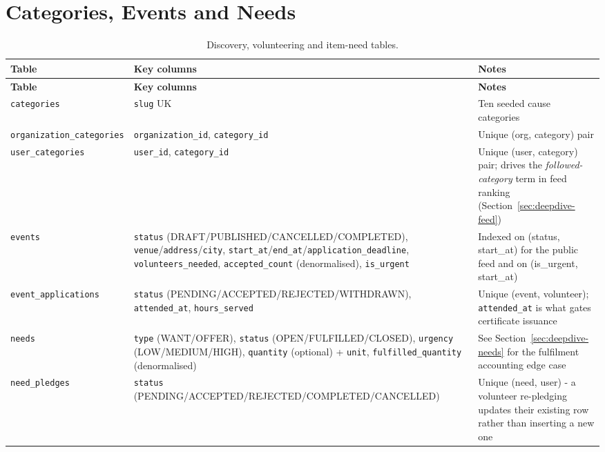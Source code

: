 \section{Categories, Events and Needs}
\begin{longtable}{|>{\raggedright\arraybackslash}p{}|>{\raggedright\arraybackslash}p{}|>{\raggedright\arraybackslash}p{}|}
\caption{Discovery, volunteering and item-need tables.}\\\hline
\textbf{Table} & \textbf{Key columns} & \textbf{Notes}\\\hline
\endfirsthead\hline\textbf{Table} & \textbf{Key columns} & \textbf{Notes}\\\hline\endhead
\texttt{categories} & \texttt{slug} UK & Ten seeded cause categories\\\hline
\texttt{organization\_\allowbreak categories} & \texttt{organization\_id}, \texttt{category\_id} & Unique (org, category) pair\\\hline
\texttt{user\_\allowbreak categories} & \texttt{user\_id}, \texttt{category\_id} & Unique (user, category) pair; drives the \emph{followed-category} term in feed ranking (Section~\ref{sec:deepdive-feed})\\\hline
\texttt{events} & \texttt{status} (DRAFT/\allowbreak PUBLISHED/\allowbreak CANCELLED/\allowbreak COMPLETED), \texttt{venue}/\allowbreak\texttt{address}/\allowbreak\texttt{city}, \texttt{start\_at}/\allowbreak\texttt{end\_at}/\allowbreak\texttt{application\_deadline}, \texttt{volunteers\_needed}, \texttt{accepted\_count} (denormalised), \texttt{is\_urgent} & Indexed on (status, start\_at) for the public feed and on (is\_urgent, start\_at)\\\hline
\texttt{event\_\allowbreak applications} & \texttt{status} (PENDING/\allowbreak ACCEPTED/\allowbreak REJECTED/\allowbreak WITHDRAWN), \texttt{attended\_at}, \texttt{hours\_served} & Unique (event, volunteer); \texttt{attended\_at} is what gates certificate issuance\\\hline
\texttt{needs} & \texttt{type} (WANT/OFFER), \texttt{status} (OPEN/FULFILLED/CLOSED), \texttt{urgency} (LOW/MEDIUM/HIGH), \texttt{quantity} (optional) + \texttt{unit}, \texttt{fulfilled\_quantity} (denormalised) & See Section~\ref{sec:deepdive-needs} for the fulfilment accounting edge case\\\hline
\texttt{need\_\allowbreak pledges} & \texttt{status} (PENDING/\allowbreak ACCEPTED/\allowbreak REJECTED/\allowbreak COMPLETED/\allowbreak CANCELLED) & Unique (need, user) - a volunteer re-pledging updates their existing row rather than inserting a new one\\\hline
\end{longtable}

